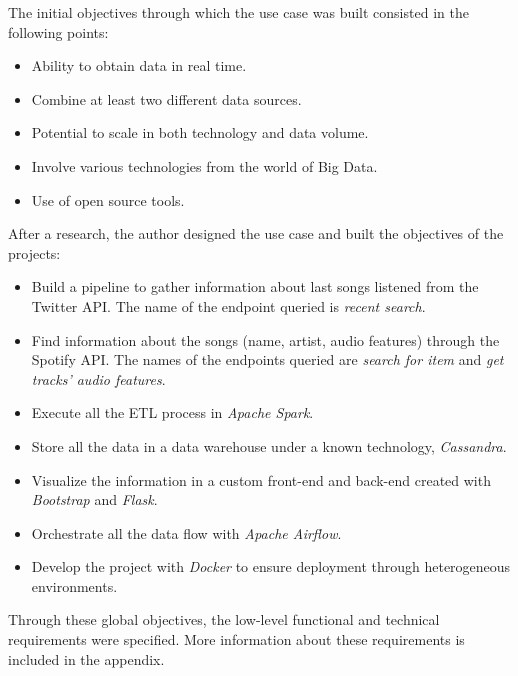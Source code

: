 

\nonzeroparskip The initial objectives through which the use case was built consisted in the following points:
\begin{itemize}
	\item Ability to obtain data in real time.
	\item Combine at least two different data sources.
	\item Potential to scale in both technology and data volume.
	\item Involve various technologies from the world of Big Data.
	\item Use of open source tools.
\end{itemize}

\nonzeroparskip After a research, the author designed the use case and built the objectives of the projects:
\begin{itemize}
	\item Build a pipeline to gather information about last songs listened from the Twitter API. The name of the endpoint queried is \textit{recent search}.
	\item Find information about the songs (name, artist, audio features) through the Spotify API. The names of the endpoints queried are \textit{search for item} and \textit{get tracks' audio features}.
	\item Execute all the ETL process in \textit{Apache Spark}.
	\item Store all the data in a data warehouse under a known technology, \textit{Cassandra}.
	\item Visualize the information in a custom front-end and back-end created with \textit{Bootstrap} and \textit{Flask}.
	\item Orchestrate all the data flow with \textit{Apache Airflow}.
	\item Develop the project with \textit{Docker} to ensure deployment through heterogeneous environments.
\end{itemize}

\nonzeroparskip Through these global objectives, the low-level functional and technical requirements were specified. More information about these requirements is included in the appendix.